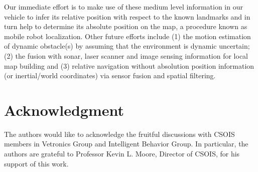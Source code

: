 \documentclass[twocolumn]{IEEEtran}
\begin{document}
Our immediate effort is to make use of these medium level information in our  vehicle to infer its relative position with respect to the known landmarks and in turn help to determine its absolute
position on the map, a procedure known as mobile robot localization.
Other future efforts include (1) the motion estimation of dynamic obstacle(s) by assuming that the environment is dynamic uncertain; (2) the fusion with sonar, laser scanner and image sensing information for local map building and
 (3)  relative navigation  without  absolution position information (or inertial/world coordinates) via sensor fusion and spatial filtering.





\section*{Acknowledgment}
The authors would like to acknowledge the fruitful discussions with 
CSOIS members in Vetronics Group and Intelligent Behavior Group. In particular, 
  the authors are grateful to Professor Kevin L. Moore,  Director of CSOIS, for his   support  of this work.
 

 
\end{document}
